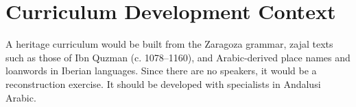 \documentclass[12pt]{article}
\begin{document}
\section{Curriculum Development Context}
A heritage curriculum would be built from the Zaragoza grammar, zajal texts such as those of Ibn Quzman (c. 1078--1160), and Arabic-derived place names and loanwords in Iberian languages. Since there are no speakers, it would be a reconstruction exercise. It should be developed with specialists in Andalusi Arabic.
\end{document}
